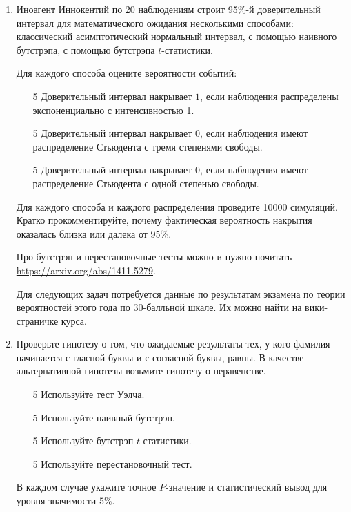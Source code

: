\documentclass[12pt]{article} %
\begin{document}
\begin{enumerate}
    \item Иноагент Иннокентий по 20 наблюдениям строит 95\%-й доверительный интервал для математического ожидания
    несколькими способами: классический асимптотический нормальный интервал, 
    с помощью наивного бутстрэпа, с помощью бутстрэпа $t$-статистики.

    Для каждого способа оцените вероятности событий:
    \begin{enumerate}
      \item [5] Доверительный интервал накрывает $1$, если наблюдения 
      распределены экспоненциально с интенсивностью 1. 
      \item [5] Доверительный интервал накрывает $0$, если наблюдения 
      имеют распределение Стьюдента с тремя степенями свободы. 
      \item [5] Доверительный интервал накрывает $0$, если наблюдения 
      имеют распределение Стьюдента с одной степенью свободы.
    \end{enumerate}
    Для каждого способа и каждого распределения проведите 10000 симуляций. 
    Кратко прокомментируйте, почему фактическая вероятность накрытия оказалась близка или далека от 95\%.

    Про бутстрэп и перестановочные тесты можно и нужно почитать \url{https://arxiv.org/abs/1411.5279}.

    Для следующих задач потребуется данные по результатам экзамена по теории вероятностей этого года 
    по 30-балльной шкале. Их можно найти на вики-страничке курса. 

    \item Проверьте гипотезу о том, что ожидаемые результаты тех, у кого фамилия начинается с гласной буквы и с согласной буквы, равны.
    В качестве альтернативной гипотезы возьмите гипотезу о неравенстве. 

    \begin{enumerate}
      \item [5] Используйте тест Уэлча. 
      \item [5] Используйте наивный бутстрэп. 
      \item [5] Используйте бутстрэп $t$-статистики. 
      \item [5] Используйте перестановочный тест.
    \end{enumerate}
    В каждом случае укажите точное $P$-значение и статистический вывод для уровня значимости $5\%$.

    




\end{enumerate}
\end{document}
